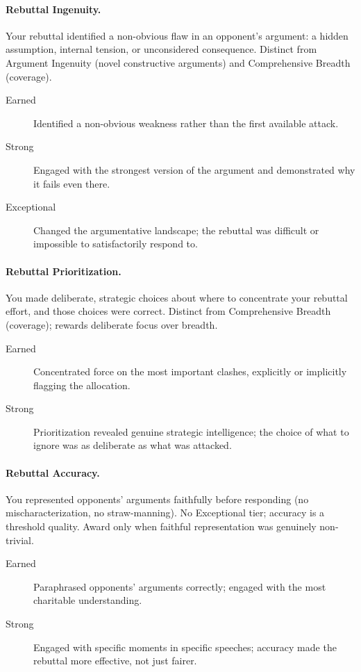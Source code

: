 \paragraph{Rebuttal Ingenuity.} Your rebuttal identified a non-obvious flaw in an opponent's argument: a hidden assumption, internal tension, or unconsidered consequence. Distinct from Argument Ingenuity (novel constructive arguments) and Comprehensive Breadth (coverage).
\begin{description}
    \item[Earned] Identified a non-obvious weakness rather than the first available attack.
    \item[Strong] Engaged with the strongest version of the argument and demonstrated why it fails even there.
    \item[Exceptional] Changed the argumentative landscape; the rebuttal was difficult or impossible to satisfactorily respond to.
\end{description}

\paragraph{Rebuttal Prioritization.} You made deliberate, strategic choices about where to concentrate your rebuttal effort, and those choices were correct. Distinct from Comprehensive Breadth (coverage); rewards deliberate focus over breadth.
\begin{description}
    \item[Earned] Concentrated force on the most important clashes, explicitly or implicitly flagging the allocation.
    \item[Strong] Prioritization revealed genuine strategic intelligence; the choice of what to ignore was as deliberate as what was attacked.
\end{description}

\paragraph{Rebuttal Accuracy.} You represented opponents' arguments faithfully before responding (no mischaracterization, no straw-manning). No Exceptional tier; accuracy is a threshold quality. Award only when faithful representation was genuinely non-trivial.
\begin{description}
    \item[Earned] Paraphrased opponents' arguments correctly; engaged with the most charitable understanding.
    \item[Strong] Engaged with specific moments in specific speeches; accuracy made the rebuttal more effective, not just fairer.
\end{description}

